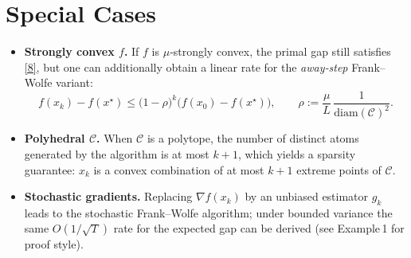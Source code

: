 \documentclass{article}
\newcommand{\diam}{\mathrm{diam}}
\begin{document}
\section*{Special Cases}
\begin{itemize}
\item \textbf{Strongly convex $f$.} If $f$ is $\mu$‑strongly convex, the primal gap still satisfies \eqref{8}, but one can additionally obtain a linear rate for the \emph{away‑step} Frank–Wolfe variant:
\[
f(x_k)-f(x^\star)\le \bigl(1-\rho\bigr)^{k}\bigl(f(x_0)-f(x^\star)\bigr),\qquad 
\rho:=\frac{\mu}{L}\,\frac{1}{\diam(\mathcal{C})^{2}} .
\]
\item \textbf{Polyhedral $\mathcal{C}$.} When $\mathcal{C}$ is a polytope, the number of distinct atoms generated by the algorithm is at most $k+1$, which yields a sparsity guarantee: $x_k$ is a convex combination of at most $k+1$ extreme points of $\mathcal{C}$.
\item \textbf{Stochastic gradients.} Replacing $\nabla f(x_k)$ by an unbiased estimator $g_k$ leads to the stochastic Frank–Wolfe algorithm; under bounded variance the same $O(1/\sqrt{T})$ rate for the expected gap can be derived (see Example 1 for proof style).
\end{itemize}
\end{document}
